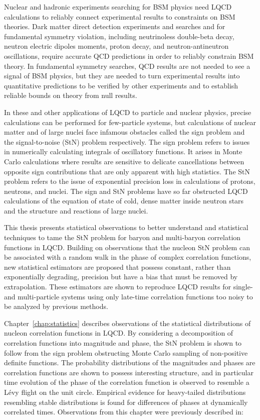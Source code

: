 Nuclear and hadronic experiments searching for BSM physics need LQCD calculations
to reliably connect experimental results
to constraints on BSM theories.
Dark matter direct detection experiments and searches and for fundamental symmetry violation, 
including neutrinoless double-beta decay, neutron electric dipoles moments, proton decay, and neutron-antineutron oscillations, 
require accurate QCD predictions in order to reliably constrain BSM theory.
In fundamental symmetry searches, QCD results are not needed to see a signal of BSM physics, but they are needed to turn experimental results into quantitative predictions to be verified by other experiments and to establish reliable bounds on theory from null results.

In these and other applications of LQCD to particle and nuclear physics,
precise calculations can be performed for few-particle systems,
but calculations of nuclear matter and of large nuclei face infamous obstacles
called the sign problem and the signal-to-noise (StN) problem respectively.
The sign problem refers to issues in
numerically calculating integrals of oscillatory functions.
It arises in Monte Carlo calculations
where results are sensitive to delicate cancellations between opposite sign contributions that are only apparent with high statistics. 
The StN problem refers to the issue of exponential precision loss in calculations of protons, neutrons, and nuclei.
The sign and StN problems have so far obstructed LQCD calculations of the equation of state of cold, dense matter inside neutron stars and the structure and reactions of large nuclei.


This thesis presents statistical observations
to better understand
and statistical techniques to tame the StN problem for baryon and multi-baryon correlation functions in LQCD.
Building on observations that the nucleon StN problem can be associated with a random walk in the phase of complex correlation functions,
new statistical estimators are proposed that possess constant, rather than exponentially degrading, precision but have a bias that must be removed by extrapolation.
These estimators are shown to reproduce LQCD results for single- and multi-particle systems using only late-time correlation functions too noisy to be analyzed by previous methods.

Chapter~\ref{chap:statistics} describes observations of the statistical distributions of nucleon correlation functions in LQCD.
By considering a decomposition of correlation functions into magnitude and phase, the StN problem is shown to follow from the sign problem obstructing Monte Carlo sampling of non-positive definite functions.
The probability distributions of the magnitudes and phases are correlation functions are shown to possess interesting structure,
and in particular time evolution of the phase of the correlation function is observed to resemble a L{\'e}vy flight on the unit circle.
Empirical evidence for heavy-tailed distributions resembling stable distributions is found for 
differences of phases at dynamically correlated times.
Observations from this chapter were previously described in:

